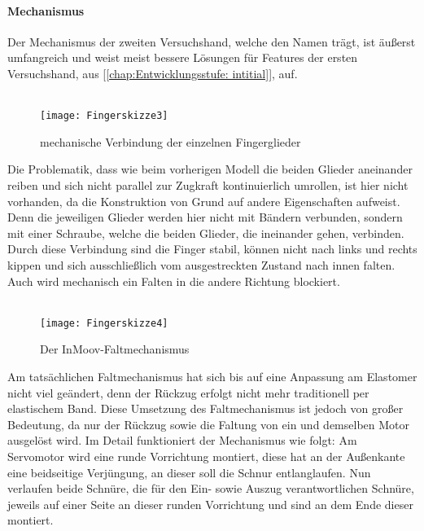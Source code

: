 \documentclass[titlepage,12pt,twoside]{article}
\begin{document}
\paragraph{Mechanismus}
\label{par:Mechanismus_zweite_Hand}
\hfill \break
\hfill \break
Der Mechanismus der zweiten Versuchshand, welche den Namen  trägt, ist äußerst umfangreich und weist meist bessere Lösungen für Features der ersten Versuchshand, aus [\textcolor{blue}{\autoref{chap:Entwicklungsstufe: intitial}}], auf. \\
\\
\begin{figure}[H]
	\begin{center}
		\scalebox{1}
		{\texttt{[image: Fingerskizze3]}}
		\caption{mechanische Verbindung der einzelnen Fingerglieder}
		\label{fig:Fingerskizze3}			
	\end{center}
\end{figure}
\hfill \break
Die Problematik, dass wie beim vorherigen Modell die beiden Glieder aneinander reiben und sich nicht parallel zur Zugkraft kontinuierlich umrollen, ist hier nicht vorhanden, da die Konstruktion von Grund auf andere Eigenschaften aufweist. 
Denn die jeweiligen Glieder werden hier nicht mit Bändern verbunden, sondern mit einer Schraube, welche die beiden Glieder, die ineinander gehen, verbinden. Durch diese Verbindung sind die Finger stabil, können nicht nach links und 
rechts kippen und sich ausschließlich vom ausgestreckten Zustand nach innen falten. Auch wird mechanisch ein Falten in die andere Richtung blockiert. \\
\\
\begin{figure}[H]
	\begin{center}
		\scalebox{1.1}
		{\texttt{[image: Fingerskizze4]}}
		\caption{Der InMoov-Faltmechanismus}
		\label{fig:Fingerskizze4}			
	\end{center}
\end{figure}
\hfill \break
Am tatsächlichen Faltmechanismus hat sich bis auf eine Anpassung am Elastomer nicht viel geändert, denn der Rückzug erfolgt nicht mehr traditionell per elastischem Band. Diese Umsetzung des Faltmechanismus ist jedoch von großer Bedeutung, da 
nur der Rückzug sowie die Faltung von ein und demselben Motor ausgelöst wird. Im Detail funktioniert der Mechanismus wie folgt: Am Servomotor wird eine runde Vorrichtung montiert, diese hat an der Außenkante 
eine beidseitige Verjüngung, an dieser soll die Schnur entlanglaufen. Nun verlaufen beide Schnüre, die für den Ein- sowie Auszug verantwortlichen Schnüre, jeweils auf einer Seite an dieser runden Vorrichtung und sind an dem Ende dieser montiert. 
\end{document}
